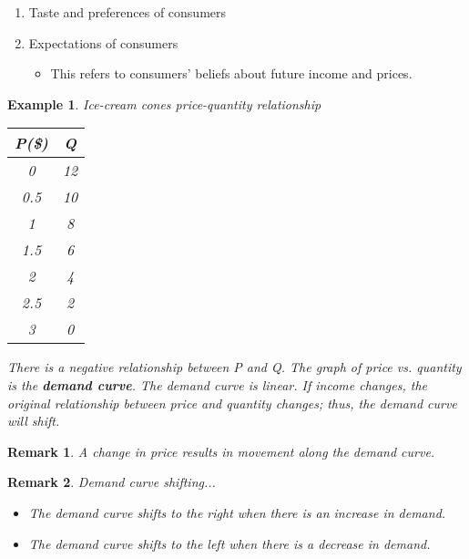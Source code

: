 \documentclass{article}
\newtheorem{example}{Example}[section]
\newtheorem*{remark}{Remark}
\newcommand{\bold}[1]{\textbf{#1}}
\newcommand{\define}[1]{\textbf{\textit{#1}}}
\begin{document}
\begin{enumerate}
\begin{itemize}
      \item When an increase in the price of one good causes the demand for another good to decrease, the two goods are called \define{complements}. 
      \item For example gasoline and big-cars can be considered \emph{complements} because as the price of gasoline increases, the demand for big-cars (that burn a lot of gas!) decreases. 
    \end{itemize}
  \item Taste and preferences of consumers 
  \item Expectations of consumers 
    \begin{itemize}
      \item This refers to consumers' beliefs about future income and prices.
    \end{itemize}
\end{enumerate} 

\begin{example}
  Ice-cream cones price-quantity relationship
  \begin{center}
    \begin{tabular}{ | c | c | }
      \hline
      \bold{P(\$)} & \bold{Q} \\
      \hline
      0 & 12 \\ 
      0.5 & 10 \\ 
      1 & 8 \\ 
      1.5 & 6 \\ 
      2 & 4 \\ 
      2.5 & 2 \\ 
      3 & 0 \\ 
      \hline 
    \end{tabular}
  \end{center}

  There is a \emph{negative relationship} between P and Q. The graph of price vs. quantity is the \bold{demand curve}. The \emph{demand curve} is linear. If income changes, the original relationship between price and quantity changes; thus, the demand curve will shift.

\end{example}

\begin{remark}
  A change in price results in movement along the demand curve. 
\end{remark}

\begin{remark}
  Demand curve shifting...
  \begin{itemize}
    \item The demand curve shifts to the right when there is an increase in demand. 
    \item The demand curve shifts to the left when there is a decrease in demand.  
  \end{itemize}
\end{remark}
\end{document}
